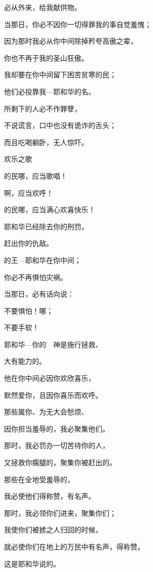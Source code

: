 {\par }{\Q 必从{}外来，给我献供物。
\par }{\Q {}当那日，你必不因你一切得罪我的事自觉羞愧；
\par }{\Q 因为那时我必从你中间除掉矜夸高傲之辈，
\par }{\Q 你也不再于我的圣山狂傲。
\par }{\Q {}我却要在你中间留下困苦贫寒的民；
\par }{\Q 他们必投靠我—耶和华的名。
\par }{\Q {}所剩下的人必不作罪孽，
\par }{\Q 不说谎言，口中也没有诡诈的舌头；
\par }{\Q 而且吃喝躺卧，无人惊吓。
\par }{\SH 欢乐之歌
\par }{\Q {}的民哪，应当歌唱！
\par }{啊，应当欢呼！
\par }{的民哪，应当满心欢喜快乐！
\par }{\Q {}耶和华已经除去你的刑罚，
\par }{\Q 赶出你的仇敌。
\par }{的王—耶和华在你中间；
\par }{\Q 你必不再惧怕灾祸。
\par }{\Q {}当那日，必有话向{}说：
\par }{\Q 不要惧怕！{}哪；
\par }{\Q 不要手软！
\par }{\Q {}耶和华—你的　神是施行拯救、
\par }{\Q 大有能力的{}。
\par }{\Q 他在你中间必因你欢欣喜乐，
\par }{\Q 默然爱你，且因你喜乐而欢呼。
\par }{\Q {}那些属你、为无大会愁烦、
\par }{\Q 因你担当羞辱的，我必聚集他们。
\par }{\Q {}那时，我必罚办一切苦待你的人，
\par }{\Q 又拯救你瘸腿的，聚集你被赶出的。
\par }{\Q 那些在全地受羞辱的，
\par }{\Q 我必使他们得称赞，有名声。
\par }{\Q {}那时，我必领你们进来，聚集你们；
\par }{\Q 我使你们被掳之人归回的时候，
\par }{\Q 就必使你们在地上的万民中有名声，得称赞。
\par }{\Q 这是耶和华说的。
\par }